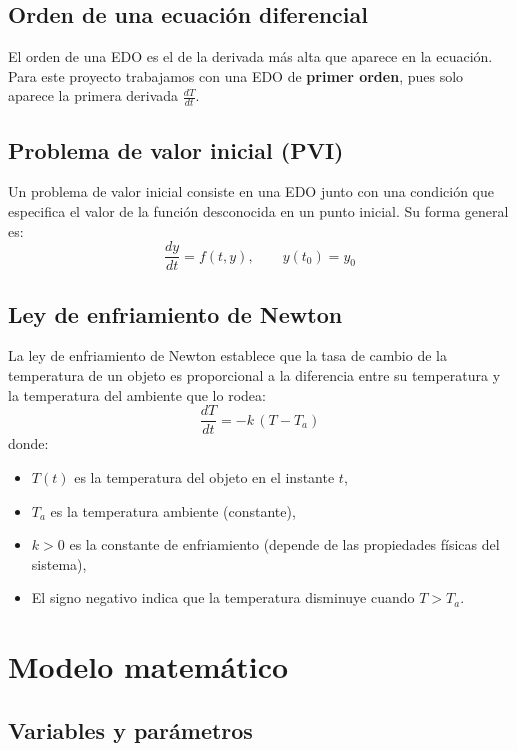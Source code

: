 \documentclass[12pt,a4paper]{article}
\begin{document}
\subsection{Orden de una ecuación diferencial}

El orden de una EDO es el de la derivada más alta que aparece en la ecuación. Para este proyecto trabajamos con una EDO de \textbf{primer orden}, pues solo aparece la primera derivada \(\frac{dT}{dt}\).

\subsection{Problema de valor inicial (PVI)}

Un problema de valor inicial consiste en una EDO junto con una condición que especifica el valor de la función desconocida en un punto inicial. Su forma general es:
\[
\frac{dy}{dt}=f(t,y),\qquad y(t_0)=y_0
\]

\subsection{Ley de enfriamiento de Newton}

La ley de enfriamiento de Newton establece que la tasa de cambio de la temperatura de un objeto es proporcional a la diferencia entre su temperatura y la temperatura del ambiente que lo rodea:
\[
\frac{dT}{dt} = -k\,(T - T_a)
\]
donde:
\begin{itemize}
  \item \(T(t)\) es la temperatura del objeto en el instante \(t\),
  \item \(T_a\) es la temperatura ambiente (constante),
  \item \(k > 0\) es la constante de enfriamiento (depende de las propiedades físicas del sistema),
  \item El signo negativo indica que la temperatura disminuye cuando \(T > T_a\).
\end{itemize}

\section{Modelo matemático}

\subsection{Variables y parámetros}
\end{document}
